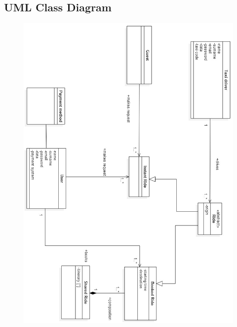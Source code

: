 \newpage
\subsection{UML Class Diagram}
	\begin{figure}[h!]
		\centering
		\includegraphics[height=0.75\textheight]{"myTaxiServiceImg/SequenceDiagram/myTaxiServiceUMLjpeg"}
	\end{figure}
